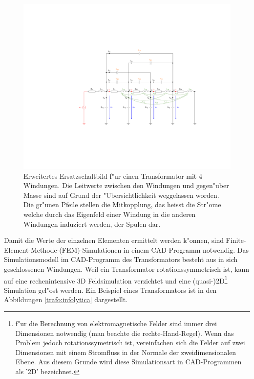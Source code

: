 \begin{refsection}
\begin{figure}
	\centering
	\includegraphics[width=\hsize]{./trafo/images/Trafo_Modell.pdf}
	\caption[Erweitertes Ersatzschaltbild f"ur einen Transformator]{Erweitertes Ersatzschaltbild f"ur einen Transformator mit 4 Windungen. Die Leitwerte zwischen den Windungen und gegen"uber Masse sind auf Grund der "Ubersichtlichkeit weggelassen worden. Die gr"unen Pfeile stellen die Mitkopplung, das heisst die Str"ome welche durch das Eigenfeld einer Windung in die anderen Windungen induziert werden, der Spulen dar. }
	\label{trafo:erweitertes_ESB}
\end{figure}

Damit die Werte der einzelnen Elementen ermittelt werden k"onnen, sind Finite-Element-Methode-(FEM)-Simulationen in einem CAD-Programm notwendig. Das Simulationsmodell im CAD-Programm des Transformators besteht aus in sich geschlossenen Windungen. Weil ein Transformator rotationssymmetrisch ist, kann auf eine rechenintensive 3D Feldsimulation verzichtet und eine (quasi-)2D\footnote{f"ur die Berechnung von elektromagnetische Felder sind immer drei Dimensionen notwendig (man beachte die rechte-Hand-Regel). Wenn das Problem jedoch rotationssymetrisch ist, vereinfachen sich die Felder auf zwei Dimensionen mit einem Stromfluss in der Normale der zweidimensionalen Ebene. Aus diesem Grunde wird diese Simulationsart in CAD-Programmen als '2D' bezeichnet.} Simulation gel"ost werden. Ein Beispiel eines Transformators ist in den Abbildungen \ref{trafo:infolytica} dargestellt.


\end{refsection}
